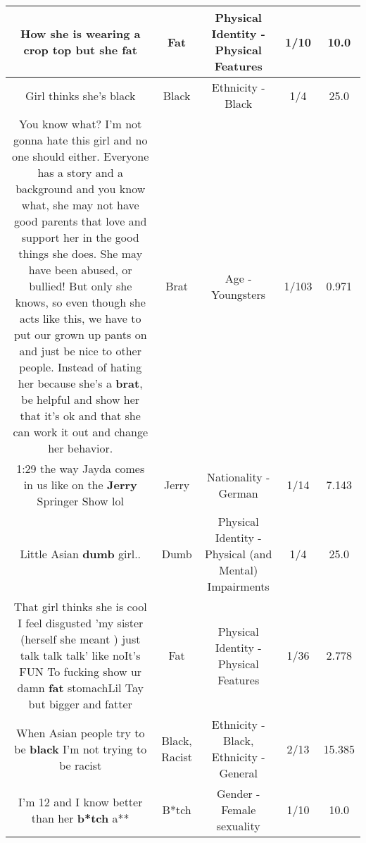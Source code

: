 \documentclass[11pt]{article}
\newlength\mylength
\begin{document}
\begin{center}
\begin{longtable}{|C{.65\mylength}|C{.30\mylength}|C{.12\mylength}|C{.12\mylength}|C{.12\mylength}|}
  \small How she is wearing a crop top but she fat\normalsize   & Fat & Physical Identity - Physical Features & 1/10 & 10.0 \\  \hline
  \small Girl thinks she's black\normalsize   & Black & Ethnicity - Black & 1/4 & 25.0 \\  \hline
  \small You know what? I'm not gonna hate this girl and no one should either. Everyone has a story and a background and you know what, she may not have good parents that love and support her in the good things she does. She may have been abused, or bullied! But only she knows, so even though she acts like this, we have to put our grown up pants on and just be nice to other people. Instead of hating her because she's a \textbf{brat}, be helpful and show her that it's ok and that she can work it out and change her behavior.\normalsize   & Brat & Age - Youngsters & 1/103 & 0.971 \\  \hline
  \small 1:29 the way Jayda comes in us like on the \textbf{Jerry} Springer Show lol\normalsize   & Jerry & Nationality - German & 1/14 & 7.143 \\  \hline
  \small Little Asian \textbf{dumb} girl..\normalsize   & Dumb & Physical Identity - Physical (and Mental) Impairments & 1/4 & 25.0 \\  \hline
  \small That girl thinks she is cool I feel disgusted 'my sister (herself she meant ) just talk talk talk' like noIt's FUN To fucking show ur damn \textbf{fat} stomachLil Tay but bigger and fatter\normalsize   & Fat & Physical Identity - Physical Features & 1/36 & 2.778 \\  \hline
  \small When Asian people try to be \textbf{black} I'm not trying to be racist\normalsize   & Black, Racist & Ethnicity - Black, Ethnicity - General & 2/13 & 15.385 \\  \hline
  \small I'm 12 and I know better than her \textbf{b*tch} a**\normalsize   & B*tch & Gender - Female sexuality & 1/10 & 10.0 \\  \hline

\end{longtable}
\end{center}
\end{document}
